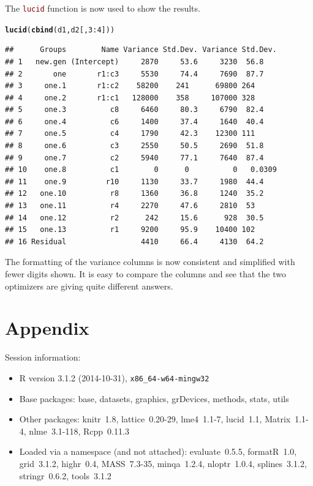 \documentclass[12pt]{article}\usepackage[]{graphicx}\usepackage[]{color}
\makeatletter
\newcommand{\hlnum}[1]{\textcolor[rgb]{0.686,0.059,0.569}{#1}}%
\newcommand{\hlopt}[1]{\textcolor[rgb]{0,0,0}{#1}}%
\newcommand{\hlstd}[1]{\textcolor[rgb]{0.345,0.345,0.345}{#1}}%
\newcommand{\hlkwd}[1]{\textcolor[rgb]{0.737,0.353,0.396}{\textbf{#1}}}%
\newenvironment{kframe}{%
 \def\at@end@of@kframe{}%
 \ifinner\ifhmode%
  \def\at@end@of@kframe{\end{minipage}}%
  \begin{minipage}{\columnwidth}%
 \fi\fi%
 \def\FrameCommand##1{\hskip\@totalleftmargin \hskip-\fboxsep
 \colorbox{shadecolor}{##1}\hskip-\fboxsep
     \hskip-\linewidth \hskip-\@totalleftmargin \hskip\columnwidth}%
 \MakeFramed {\advance\hsize-\width
   \@totalleftmargin\z@ \linewidth\hsize
   \@setminipage}}%
 {\par\unskip\endMakeFramed%
 \at@end@of@kframe}
\newenvironment{knitrout}{}{} %
\newcommand{\code}[1]{\texttt{\textcolor{maroon}{#1}}}
\makeatother
\begin{document}
The \code{lucid} function is now used to show the results.
\begin{knitrout}
\color{fgcolor}\begin{kframe}
\begin{alltt}
\hlkwd{lucid}\hlstd{(}\hlkwd{cbind}\hlstd{(d1,d2[,}\hlnum{3}\hlopt{:}\hlnum{4}\hlstd{]))}
\end{alltt}
\begin{verbatim}
##      Groups        Name Variance Std.Dev. Variance Std.Dev.
## 1   new.gen (Intercept)     2870     53.6     3230  56.8   
## 2       one       r1:c3     5530     74.4     7690  87.7   
## 3     one.1       r1:c2    58200    241      69800 264     
## 4     one.2       r1:c1   128000    358     107000 328     
## 5     one.3          c8     6460     80.3     6790  82.4   
## 6     one.4          c6     1400     37.4     1640  40.4   
## 7     one.5          c4     1790     42.3    12300 111     
## 8     one.6          c3     2550     50.5     2690  51.8   
## 9     one.7          c2     5940     77.1     7640  87.4   
## 10    one.8          c1        0      0          0   0.0309
## 11    one.9         r10     1130     33.7     1980  44.4   
## 12   one.10          r8     1360     36.8     1240  35.2   
## 13   one.11          r4     2270     47.6     2810  53     
## 14   one.12          r2      242     15.6      928  30.5   
## 15   one.13          r1     9200     95.9    10400 102     
## 16 Residual                 4410     66.4     4130  64.2
\end{verbatim}
\end{kframe}
\end{knitrout}
The formatting of the variance columns is now consistent and simplified
with fewer digits shown.  It is easy to compare the columns and see
that the two optimizers are giving quite different answers.


\section{Appendix}

Session information:
\begin{itemize}\raggedright
  \item R version 3.1.2 (2014-10-31), \verb|x86_64-w64-mingw32|
  \item Base packages: base, datasets, graphics, grDevices, methods, stats,
    utils
  \item Other packages: knitr~1.8, lattice~0.20-29, lme4~1.1-7, lucid~1.1,
    Matrix~1.1-4, nlme~3.1-118, Rcpp~0.11.3
  \item Loaded via a namespace (and not attached): evaluate~0.5.5, formatR~1.0,
    grid~3.1.2, highr~0.4, MASS~7.3-35, minqa~1.2.4, nloptr~1.0.4,
    splines~3.1.2, stringr~0.6.2, tools~3.1.2
\end{itemize}



\end{document}
